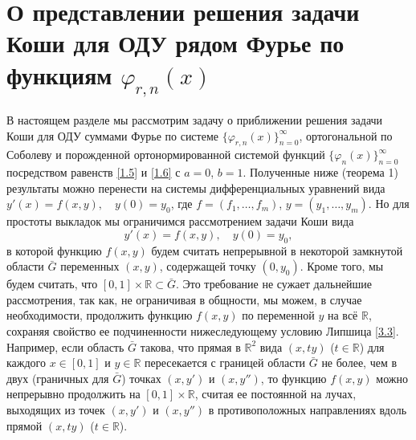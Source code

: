 \section{О представлении решения задачи Коши для ОДУ рядом Фурье по функциям $\varphi_{r,n}(x)$}
В настоящем разделе мы рассмотрим задачу о приближении решения задачи Коши для ОДУ  суммами  Фурье по системе $\{\varphi_{r,n}(x)\}_{n=0}^\infty$, ортогональной по Соболеву и порожденной ортонормированной системой функций $\{\varphi_{n}(x)\}_{n=0}^\infty$ посредством равенств \eqref{1.5} и \eqref{1.6} с $a=0$, $b=1$.
 Полученные ниже (теорема 1) результаты можно перенести на системы дифференциальных уравнений вида
$y'(x)=f(x,y), \quad y(0)=y_0$, где $f=(f_1, \ldots, f_m)$, $y=(y_1, \ldots, y_m)$. Но для простоты выкладок мы ограничимся рассмотрением задачи Коши вида
\begin{equation}\label{3.1}
y'(x)=f(x,y), \quad y(0)=y_0,
\end{equation}
 в которой функцию   $f(x,y)$  будем считать непрерывной в некоторой замкнутой  области $\bar G$ переменных $(x,y)$, содержащей точку $(0,y_0)$. Кроме того, мы будем  считать, что  $[0,1]\times\mathbb{R}\subset\bar G$. Это требование не сужает дальнейшие рассмотрения, так как, не ограничивая в общности,  мы можем, в случае необходимости, продолжить функцию $f(x,y)$ по переменной $y$ на всё $\mathbb{R}$, сохраняя свойство ее подчиненности  нижеследующему условию Липшица \eqref{3.3}. Например, если область $\bar G$ такова, что  прямая в $\mathbb{R}^{2}$ вида $(x,ty)$ ($t\in\mathbb{R}$) для каждого $x\in[0,1]$ и $y\in\mathbb{R}$ пересекается с границей области $\bar G$ не более, чем в двух (граничных для $\bar G$) точках $(x,y')$ и $(x,y'')$, то функцию $f(x,y)$ можно непрерывно продолжить   на $[0,1]\times\mathbb{R}$, считая ее  постоянной на лучах, выходящих из точек  $(x,y')$ и $(x,y'')$ в противоположных направлениях вдоль прямой $(x,ty)$ ($t\in\mathbb{R}$).

